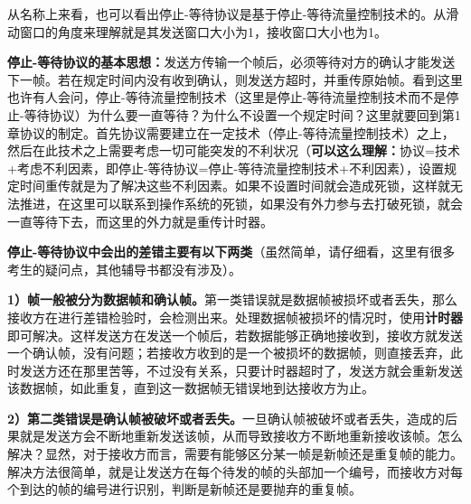 从名称上来看，也可以看出停止-等待协议是基于{停止-等待流量控制技术}的。从滑动窗口的角度来理解就是其发送窗口大小为1，接收窗口大小也为1。

\textbf{停止-等待协议的基本思想：}发送方传输一个帧后，必须等待对方的确认才能发送下一帧。若在规定时间内没有收到确认，则发送方超时，并重传原始帧。看到这里也许有人会问，停止-等待流量控制技术（这里是停止-等待流量控制技术而不是停止-等待协议）为什么要一直等待？为什么不设置一个规定时间？这里就要回到第1章协议的制定。首先协议需要建立在一定技术（停止-等待流量控制技术）之上，然后在此技术之上需要考虑一切可能突发的不利状况（\textbf{可以这么理解：}协议=技术+考虑不利因素，即停止-等待协议=停止-等待流量控制技术+不利因素），设置规定时间重传就是为了解决这些不利因素。如果不设置时间就会造成死锁，这样就无法推进，在这里可以联系到操作系统的死锁，如果没有外力参与去打破死锁，就会一直等待下去，而这里的外力就是重传计时器。

\textbf{{停止-等待协议中会出的差错主要有以下两类}}（虽然简单，请仔细看，这里有很多考生的疑问点，其他辅导书都没有涉及）。

\textbf{1）帧一般被分为数据帧和确认帧。}第一类错误就是数据帧被损坏或者丢失，那么接收方在进行差错检验时，会检测出来。处理数据帧被损坏的情况时，使用\textbf{计时器}即可解决。这样发送方在发送一个帧后，若数据能够正确地接收到，接收方就发送一个确认帧，没有问题；若接收方收到的是一个被损坏的数据帧，则直接丢弃，此时发送方还在那里苦等，不过没有关系，{只要计时器超时了，发送方就会重新发送该数据帧}，如此重复，直到这一数据帧无错误地到达接收方为止。

\textbf{2）第二类错误是确认帧被破坏或者丢失。}一旦确认帧被破坏或者丢失，造成的后果就是发送方会不断地重新发送该帧，从而导致接收方不断地重新接收该帧。怎么解决？显然，对于接收方而言，需要有能够区分某一帧是新帧还是重复帧的能力。解决方法很简单，就是让发送方在每个待发的帧的头部加一个编号，而接收方对每个到达的帧的编号进行识别，{判断是新帧还是要抛弃的重复帧}。
